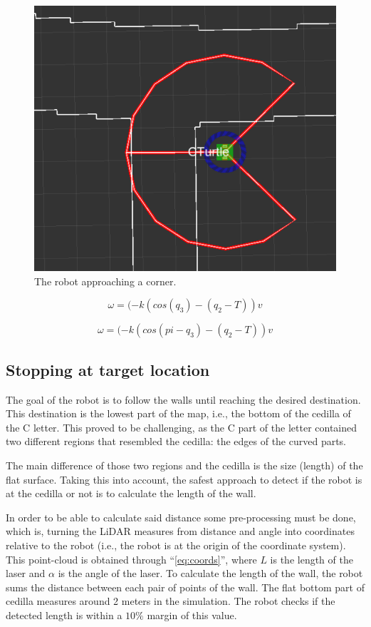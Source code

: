 \documentclass[conference]{IEEEtran}
\begin{document}
\begin{figure}[htbp]
    \centerline{\includegraphics[width=0.5\linewidth]{images/corner.png}}
    \caption{The robot approaching a corner.}
    \label{fig:corner}
\end{figure}

\begin{equation}
\omega = (-k(cos(q_3) - (q_2 - T)) v \label{leftEq}
\end{equation}

\begin{equation}
\omega = (-k(cos(pi - q_3) - (q_2 - T)) v \label{rightEq}
\end{equation}

\subsection{Stopping at target location}

The goal of the robot is to follow the walls until reaching the desired destination. This destination is the lowest part of the map, i.e., the bottom of the cedilla of the C letter. This proved to be challenging, as the C part of the letter contained two different regions that resembled the cedilla: the edges of the curved parts.

The main difference of those two regions and the cedilla is the size (length) of the flat surface. Taking this into account, the safest approach to detect if the robot is at the cedilla or not is to calculate the length of the wall.

In order to be able to calculate said distance some pre-processing must be done, which is, turning the LiDAR measures from distance and angle into coordinates relative to the robot (i.e., the robot is at the origin of the coordinate system). This point-cloud is obtained through ``\eqref{eq:coords}'', where $L$ is the length of the laser and $\alpha$ is the angle of the laser. To calculate the length of the wall, the robot sums the distance between each pair of points of the wall. The flat bottom part of cedilla measures around 2 meters in the simulation. The robot checks if the detected length is within a $10\%$ margin of this value.
\end{document}
